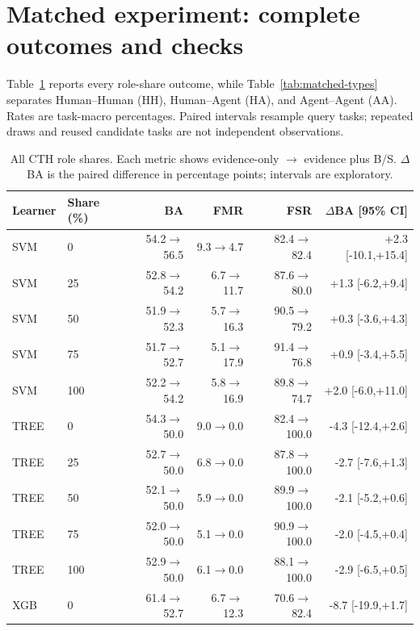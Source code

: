 \section{Matched experiment: complete outcomes and checks}\label{app:matched}

Table~\ref{tab:matched-shares} reports every role-share outcome, while Table~\ref{tab:matched-types} separates Human--Human (HH), Human--Agent (HA), and Agent--Agent (AA). Rates are task-macro percentages. Paired intervals resample query tasks; repeated draws and reused candidate tasks are not independent observations.

\begin{table}[ht]
\centering\compacttable
\caption{All CTH role shares. Each metric shows evidence-only $\rightarrow$ evidence plus B/S. $\Delta$BA is the paired difference in percentage points; intervals are exploratory.}
\label{tab:matched-shares}
\begin{tabular*}{\linewidth}{@{\extracolsep{\fill}}llrrrr@{}}
\toprule Learner & Share (\%) & BA & FMR & FSR & $\Delta$BA [95\% CI] \\
\midrule
SVM & 0 & 54.2$\rightarrow$56.5 & 9.3$\rightarrow$4.7 & 82.4$\rightarrow$82.4 & +2.3 [-10.1,+15.4] \\
SVM & 25 & 52.8$\rightarrow$54.2 & 6.7$\rightarrow$11.7 & 87.6$\rightarrow$80.0 & +1.3 [-6.2,+9.4] \\
SVM & 50 & 51.9$\rightarrow$52.3 & 5.7$\rightarrow$16.3 & 90.5$\rightarrow$79.2 & +0.3 [-3.6,+4.3] \\
SVM & 75 & 51.7$\rightarrow$52.7 & 5.1$\rightarrow$17.9 & 91.4$\rightarrow$76.8 & +0.9 [-3.4,+5.5] \\
SVM & 100 & 52.2$\rightarrow$54.2 & 5.8$\rightarrow$16.9 & 89.8$\rightarrow$74.7 & +2.0 [-6.0,+11.0] \\
TREE & 0 & 54.3$\rightarrow$50.0 & 9.0$\rightarrow$0.0 & 82.4$\rightarrow$100.0 & -4.3 [-12.4,+2.6] \\
TREE & 25 & 52.7$\rightarrow$50.0 & 6.8$\rightarrow$0.0 & 87.8$\rightarrow$100.0 & -2.7 [-7.6,+1.3] \\
TREE & 50 & 52.1$\rightarrow$50.0 & 5.9$\rightarrow$0.0 & 89.9$\rightarrow$100.0 & -2.1 [-5.2,+0.6] \\
TREE & 75 & 52.0$\rightarrow$50.0 & 5.1$\rightarrow$0.0 & 90.9$\rightarrow$100.0 & -2.0 [-4.5,+0.4] \\
TREE & 100 & 52.9$\rightarrow$50.0 & 6.1$\rightarrow$0.0 & 88.1$\rightarrow$100.0 & -2.9 [-6.5,+0.5] \\
XGB & 0 & 61.4$\rightarrow$52.7 & 6.7$\rightarrow$12.3 & 70.6$\rightarrow$82.4 & -8.7 [-19.9,+1.7] \\

\end{tabular*}
\end{table}
